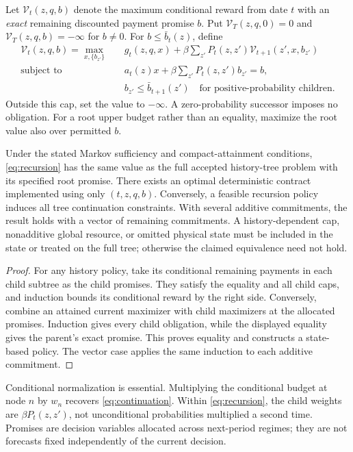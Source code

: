 Let $\mathcal V_t(z,q,b)$ denote the maximum conditional reward from date $t$ with an \emph{exact} remaining discounted payment promise $b$. Put $\mathcal V_T(z,q,0)=0$ and $\mathcal V_T(z,q,b)=-\infty$ for $b\ne0$. For $b\leq\bar b_t(z)$, define
\begin{equation}\label{eq:recursion}
 \begin{split}
 \mathcal V_t(z,q,b)=\max_{x,\{b_{z'}\}}\quad&
 g_t(z,q,x)+\beta\sum_{z'}P_t(z,z')\mathcal V_{t+1}(z',x,b_{z'})\\
 \text{subject to}\quad& a_t(z)x+\beta\sum_{z'}P_t(z,z')b_{z'}=b,\\
 &b_{z'}\leq\bar b_{t+1}(z')\quad\text{for positive-probability children}.
 \end{split}
\end{equation}
Outside this cap, set the value to $-\infty$. A zero-probability successor imposes no obligation. For a root upper budget rather than an equality, maximize the root value also over permitted $b$.

\begin{theorem}\label{thm:recursion}
Under the stated Markov sufficiency and compact-attainment conditions, \eqref{eq:recursion} has the same value as the full accepted history-tree problem with its specified root promise. There exists an optimal deterministic contract implemented using only $(t,z,q,b)$. Conversely, a feasible recursion policy induces all tree continuation constraints. With several additive commitments, the result holds with a vector of remaining commitments. A history-dependent cap, nonadditive global resource, or omitted physical state must be included in the state or treated on the full tree; otherwise the claimed equivalence need not hold.
\end{theorem}
\begin{proof}
For any history policy, take its conditional remaining payments in each child subtree as the child promises. They satisfy the equality and all child caps, and induction bounds its conditional reward by the right side. Conversely, combine an attained current maximizer with child maximizers at the allocated promises. Induction gives every child obligation, while the displayed equality gives the parent's exact promise. This proves equality and constructs a state-based policy. The vector case applies the same induction to each additive commitment.\end{proof}

Conditional normalization is essential. Multiplying the conditional budget at node $n$ by $w_n$ recovers \eqref{eq:continuation}. Within \eqref{eq:recursion}, the child weights are $\beta P_t(z,z')$, not unconditional probabilities multiplied a second time. Promises are decision variables allocated across next-period regimes; they are not forecasts fixed independently of the current decision.

